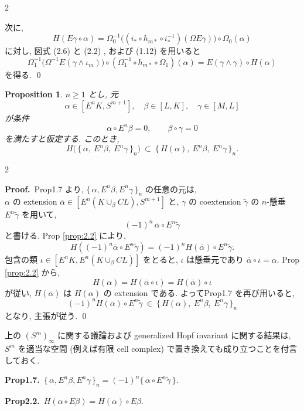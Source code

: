 \documentclass[10pt, leqno]{ltjsarticle} %
\newcommand{\todai}[2][]{\{\,#2\,\}_{#1}}      %
\newcommand{\gen}[1]{\{\,#1\,\}}       %
\newcommand{\ext}[1]{\overline{#1}}     %
\newcommand{\coext}[1]{\widetilde{#1}}  %
\numberwithin{equation}{section}
\theoremstyle{plain}
\newtheorem{proposition}[theorem]{Proposition}
\theoremstyle{definition}
\theoremstyle{remark}
\begin{document}
\begin{paracol}{2}

次に,
\[
H(E\gamma\circ\alpha)
= \Omega_0^{-1}\!\bigl((i_*\circ h_{m*}\circ i_*^{-1})(\Omega E\gamma)\bigr)\circ \Omega_0(\alpha)
\]
に対し, 図式 (2.6) と (2.2) , および (1.12) を用いると
\[
\Omega_1^{-1}\!\bigl(\Omega^{-1}E(\gamma\wedge\iota_m)\bigr)\circ (\Omega_1^{-1}\circ h_{m*}\circ \Omega_1)(\alpha)
= E(\gamma\wedge\gamma)\circ H(\alpha)
\]
を得る. 
\qed

\medskip

\begin{proposition}\label{prop:2.3}
$n\ge1$ とし, 元
\[
\alpha\in[E^nK, S^{m+1}],\quad
\beta\in[L, K],\quad
\gamma\in[M, L]
\]
が条件
\[
\alpha\circ E^n\beta=0,\qquad \beta\circ\gamma=0
\]
を満たすと仮定する. このとき,
\[
H\!\bigl(\,\{\,\alpha,\ E^n\beta,\ E^n\gamma\,\}_n\bigr)\ \subset\
\{\,H(\alpha),\ E^n\beta,\ E^n\gamma\,\}_n .
\]
\end{proposition}
  
\end{paracol}

\begin{paracol}{2}

\noindent
\textbf{Proof.}\
Prop1.7 より, $\{\,\alpha,E^n\beta,E^n\gamma\,\}_n$ の任意の元は, \\
$\alpha$ の extension $\overline\alpha\in[E^n(K\cup_\beta CL), S^{m+1}]$
と, $\gamma$ の coextension 
$\widetilde\gamma$ の $n$-懸垂 $E^n\tilde\gamma$ を用いて,
\[
(-1)^n\,\overline{\alpha}\circ E^n\widetilde{\gamma}
\]
と書ける. Prop \ref{prop:2.2} により,
\[
H((-1)^n\overline\alpha\circ E^n\widetilde\gamma)
=(-1)^n H(\overline\alpha)\circ E^n\widetilde\gamma .
\]
包含の類 $\iota\in[E^nK, E^n(K\cup_\beta CL)]$ をとると, 
$\iota$ は懸垂元であり $\overline\alpha\circ\iota=\alpha$. 
Prop \ref{prop:2.2} から,
\[
H(\alpha)=H(\overline\alpha\circ\iota)=H(\overline{\alpha})\circ\iota
\]
が従い, $H(\overline\alpha)$ は $H(\alpha)$ の extension である. 
よってProp1.7 を再び用いると,
\[
(-1)^n H(\ext{\alpha})\circ E^n\coext{\gamma}\ \in\
\{\,H(\alpha),\ E^n\beta,\ E^n\gamma\,\}_n
\]
となり, 主張が従う. 
\qed

上の $(S^m)_\infty$ に関する議論および generalized Hopf invariant に関する結果は, \\
$S^m$ を適当な空間 (例えば有限 cell complex) 
で置き換えても成り立つことを付言しておく. 

\switchcolumn

\noindent
\textbf{Prop1.7.}\
\(\todai[n]{\alpha, E^n\beta, E^n\gamma}
= (-1)^n\gen{\overline{\alpha}\circ E^n\widetilde{\gamma}}\).

\noindent
\textbf{Prop2.2.}\
\(H(\alpha\circ E\beta) = H(\alpha)\circ E\beta.\)

\end{paracol}
\end{document}
